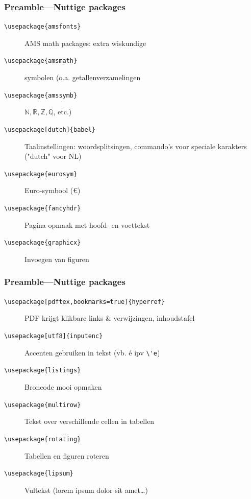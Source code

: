 \documentclass{beamer}
\begin{document}
\begin{frame}[fragile]
  \frametitle{Preamble---Nuttige packages}
  
  \begin{description}
  \item[\texttt{\textbackslash{}usepackage\{amsfonts\}}] AMS math packages: extra wiskundige
  \item[\texttt{\textbackslash{}usepackage\{amsmath\}}] symbolen (o.a. getallenverzamelingen
  \item[\texttt{\textbackslash{}usepackage\{amssymb\}}] $\mathbb{N}, \mathbb{R}, \mathbb{Z}, \mathbb{Q}$, etc.)
  \pause
  \item[\texttt{\textbackslash{}usepackage[dutch]\{babel\}}] Taalinstellingen: woordsplitsingen, commando's voor speciale karakters ("dutch" voor NL)
  \pause
  \item[\texttt{\textbackslash{}usepackage\{eurosym\}}] Euro-symbool (\euro)
  \pause
  \item[\texttt{\textbackslash{}usepackage\{fancyhdr\}}] Pagina-opmaak met hoofd- en voettekst
  \pause
  \item[\texttt{\textbackslash{}usepackage\{graphicx\}}] Invoegen van figuren
  \end{description}
\end{frame}

\begin{frame}[fragile]
  \frametitle{Preamble---Nuttige packages}
  
  \begin{description}
  \item[\texttt{\textbackslash{}usepackage[pdftex,bookmarks=true]\{hyperref\}}] PDF krijgt klikbare links \& verwijzingen, inhoudstafel \pause
  \item[\texttt{\textbackslash{}usepackage[utf8]\{inputenc\}}] Accenten gebruiken in tekst (vb. é ipv \verb|\'e|) \pause
  \item[\texttt{\textbackslash{}usepackage\{listings\}}] Broncode mooi opmaken \pause
  \item[\texttt{\textbackslash{}usepackage\{multirow\}}] Tekst over verschillende cellen in tabellen \pause
  \item[\texttt{\textbackslash{}usepackage\{rotating\}}] Tabellen en figuren roteren \pause
  \item[\texttt{\textbackslash{}usepackage\{lipsum\}}] Vultekst (lorem ipsum dolor sit amet\ldots)
  \end{description}
\end{frame}
\end{document}

